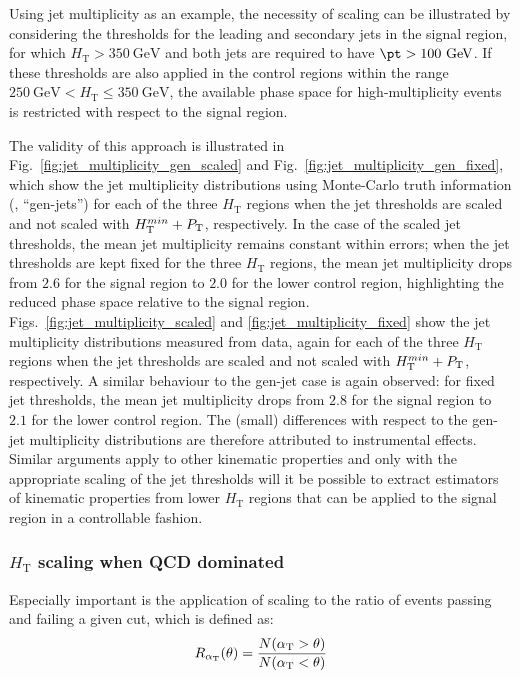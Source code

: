 Using jet multiplicity as an example, the necessity of scaling can be
illustrated by considering the \pt thresholds for the leading and
secondary jets in the signal region, for which $H_{\mathrm{T}} >
350~\mathrm{GeV}$ and both jets are required to have $\pt >
100~\mathrm{GeV}$. If these thresholds are also applied in the control
regions within the range $250~\mathrm{GeV} < H_{\mathrm{T}} \leq
350~\mathrm{GeV}$, the available phase space for high-multiplicity
events is restricted with respect to the signal region. 

The validity of this approach is illustrated in
Fig.~\ref{fig:jet_multiplicity_gen_scaled} and
Fig.~\ref{fig:jet_multiplicity_gen_fixed}, which show the jet
multiplicity distributions using Monte-Carlo truth information (\ie,
``gen-jets'') for each of the three $H_{\mathrm{T}}$ regions when the
jet \pt thresholds are scaled and not scaled with
$H_{\mathrm{T}}^{min} + P_{\mathrm{T}}$, respectively. In the case of the
scaled jet \pt thresholds, the mean jet multiplicity remains constant
within errors; when the jet \pt thresholds are kept fixed for the
three $H_{\mathrm{T}}$ regions, the mean jet multiplicity drops from
$2.6$ for the signal region to $2.0$ for the lower control region,
highlighting the reduced phase space relative to the signal
region. Figs.~\ref{fig:jet_multiplicity_scaled} and
\ref{fig:jet_multiplicity_fixed} show the jet multiplicity
distributions measured from data, again for each of the three
$H_{\mathrm{T}}$ regions when the jet \pt thresholds are scaled and
not scaled with $H_{\mathrm{T}}^{min} + P_{\mathrm{T}}$, respectively. A
similar behaviour to the gen-jet case is again observed: for fixed jet
\pt thresholds, the mean jet multiplicity drops from $2.8$ for the
signal region to $2.1$ for the lower control region. The (small)
differences with respect to the gen-jet multiplicity distributions are
therefore attributed to instrumental effects. Similar arguments apply
to other kinematic properties and only with the appropriate scaling of
the jet \pt thresholds will it be possible to extract estimators of
kinematic properties from lower $H_{\mathrm{T}}$ regions that can be
applied to the signal region in a controllable fashion.

\subsubsection{$H_{\mathrm{T}}$ scaling when QCD dominated}

Especially important is the application of scaling to the ratio of
events passing and failing a given \aT cut, which is defined as:
\begin{equation}
  R_{\alpha_{\mathrm{T}}}(\theta) = \frac{N(\alpha_{\mathrm{T}}>\theta)}{N(\alpha_{\mathrm{T}}<\theta)}
\end{equation}

